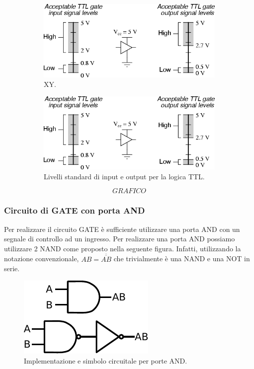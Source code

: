\begin{figure}[htpc]
\centering
	\begin{subfigure}[hc]{0.49\textwidth}
		\centering
		\includegraphics[width=.95\textwidth]{../E09/latex/TTL.png}
                \caption{XY.}
                \label{fig9:XY}
        \end{subfigure}%
	\quad
        \begin{subfigure}[hc]{0.49\textwidth}
		\centering
		\includegraphics[width=.95\textwidth]{../E09/latex/TTL.png}
                \caption{Livelli standard di input e output per la logica TTL.}
                \label{fig9:TTL}
        \end{subfigure}
\caption{}
\end{figure}

$$GRAFICO$$

\subsubsection{Circuito di GATE con porta AND}
Per realizzare il circuito GATE è sufficiente utilizzare una porta AND con un segnale di controllo ad un ingresso.
Per realizzare una porta AND possiamo utilizzare 2 NAND come proposto nella seguente figura.
Infatti, utilizzando la notazione convenzionale, $AB=\overline {\overline {AB}}$ che trivialmente è una NAND e una NOT in serie.
 
\begin{figure}
\centering
\includegraphics[width=.22\textwidth]{../E09/latex/AND.pdf}
\caption{Implementazione e simbolo circuitale per porte AND.}
\label{cir9:AND}
\end{figure}

